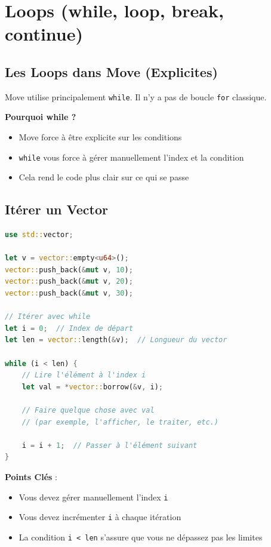 \documentclass[11pt]{article}
\begin{document}
\section{Loops (while, loop, break, continue)}

\subsection{Les Loops dans Move (Explicites)}

Move utilise principalement \texttt{while}. Il n'y a pas de boucle \texttt{for} classique.

\begin{explainBox}
\textbf{Pourquoi while ?}
\begin{itemize}
  \item Move force à être explicite sur les conditions
  \item \texttt{while} vous force à gérer manuellement l'index et la condition
  \item Cela rend le code plus clair sur ce qui se passe
\end{itemize}
\end{explainBox}

\subsection{Itérer un Vector}

\begin{lstlisting}[language=Rust, caption=Itérer un Vector avec while]
use std::vector;

let v = vector::empty<u64>();
vector::push_back(&mut v, 10);
vector::push_back(&mut v, 20);
vector::push_back(&mut v, 30);

// Itérer avec while
let i = 0;  // Index de départ
let len = vector::length(&v);  // Longueur du vector

while (i < len) {
    // Lire l'élément à l'index i
    let val = *vector::borrow(&v, i);
    
    // Faire quelque chose avec val
    // (par exemple, l'afficher, le traiter, etc.)
    
    i = i + 1;  // Passer à l'élément suivant
}
\end{lstlisting}

\begin{noteBox}
\textbf{Points Clés} :
\begin{itemize}
  \item Vous devez gérer manuellement l'index \texttt{i}
  \item Vous devez incrémenter \texttt{i} à chaque itération
  \item La condition \texttt{i < len} s'assure que vous ne dépassez pas les limites
\end{itemize}
\end{noteBox}
\end{document}
